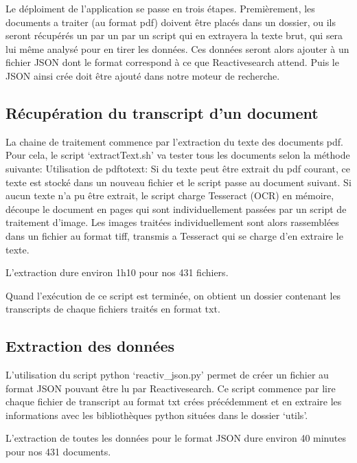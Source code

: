 

Le déploiment de l'application se passe en trois étapes.
Premièrement, les documents a traiter (au format pdf) doivent être placés dans un dossier, ou ils seront récupérés un par un par un script qui en extrayera la texte brut, qui sera lui même analysé pour en tirer les données.
Ces données seront alors ajouter à un fichier JSON dont le format correspond à ce que Reactivesearch attend.
Puis le JSON ainsi crée doit être ajouté dans notre moteur de recherche.

\subsection{Récupération du transcript d'un document}
La chaine de traitement commence par l'extraction du texte des documents pdf.
Pour cela, le script `extractText.sh' va tester tous les documents selon la méthode suivante:\newline
Utilisation de pdftotext: Si du texte peut être extrait du pdf courant, ce texte est stocké dans un nouveau fichier et le script passe au document suivant.\newline
Si aucun texte n'a pu être extrait, le script charge Tesseract (OCR) en mémoire, découpe le document en pages qui sont individuellement passées par un script de traitement d'image.
Les images traitées individuellement sont alors rassemblées dans un fichier au format tiff, transmis a Tesseract qui se charge d'en extraire le texte.

L'extraction dure environ 1h10 pour nos 431 fichiers.

Quand l'exécution de ce script est terminée, on obtient un dossier contenant les transcripts de chaque fichiers traités en format txt.

\subsection{Extraction des données}
L'utilisation du script python `reactiv\_json.py' permet de créer un fichier au format JSON pouvant être lu par Reactivesearch.
Ce script commence par lire chaque fichier de transcript au format txt crées précédemment et en extraire les informations avec les bibliothèques python situées dans le dossier `utils'.

L'extraction de toutes les données pour le format JSON dure environ 40 minutes pour nos 431 documents.


